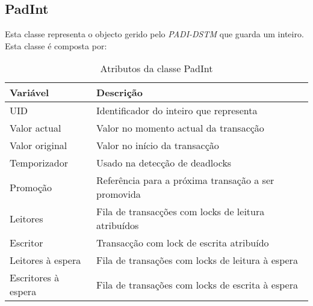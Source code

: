 \subsection{PadInt}

Esta classe representa o objecto gerido pelo \textit{PADI-DSTM} que guarda um inteiro. Esta classe é composta por:
\begin{table}[H]
\centering
\begin{tabular}{| p{2cm} | p{5cm} |}
\hline
\textbf{Variável} & \textbf{Descrição} \\
\hline
UID & Identificador do inteiro que representa \\
\hline
Valor actual & Valor no momento actual da transacção \\
\hline
Valor original & Valor no início da transacção \\
\hline
Temporizador & Usado na detecção de deadlocks \\
\hline
Promoção & Referência para a próxima transação a ser promovida\\
\hline
Leitores & Fila de transacções com locks de leitura atribuídos \\
\hline
Escritor & Transacção com lock de escrita atribuído\\
\hline
Leitores à espera & Fila de transações com locks de leitura à espera \\
\hline
Escritores à espera & Fila de transações com locks de escrita à espera\\
\hline
\end{tabular}
\caption{Atributos da classe PadInt}\label{tab:padint}
\end{table}
